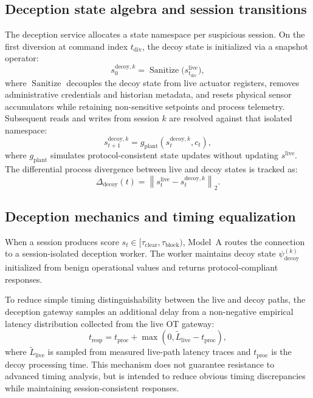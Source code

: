 \documentclass[journal]{IEEEtran}
\DeclareMathOperator{\Sanitize}{Sanitize}
\begin{document}
\subsection{Deception state algebra and session transitions}
The deception service allocates a state namespace per suspicious session. On the first diversion at command index $t_{\mathrm{div}}$, the decoy state is initialized via a snapshot operator:
\begin{equation}
s_0^{\mathrm{decoy}, k} = \Sanitize\bigl(s_{t_{\mathrm{div}}}^{\mathrm{live}}\bigr),
\end{equation}
where $\Sanitize$ decouples the decoy state from live actuator registers, removes administrative credentials and historian metadata, and resets physical sensor accumulators while retaining non-sensitive setpoints and process telemetry. Subsequent reads and writes from session $k$ are resolved against that isolated namespace:
\begin{equation}
s_{t+1}^{\mathrm{decoy}, k} = g_{\mathrm{plant}}(s_t^{\mathrm{decoy}, k}, c_t),
\end{equation}
where $g_{\mathrm{plant}}$ simulates protocol-consistent state updates without updating $s^{\mathrm{live}}$. The differential process divergence between live and decoy states is tracked as:
\begin{equation}
\Delta_{\mathrm{decoy}}(t) = \left\| s_t^{\mathrm{live}} - s_t^{\mathrm{decoy}, k} \right\|_2.
\end{equation}

\subsection{Deception mechanics and timing equalization}
When a session produces score $s_t \in [\tau_{\mathrm{clear}}, \tau_{\mathrm{block}})$, Model~A routes the connection to a session-isolated deception worker. The worker maintains decoy state $\psi_{\mathrm{decoy}}^{(k)}$ initialized from benign operational values and returns protocol-compliant responses.

To reduce simple timing distinguishability between the live and decoy paths, the deception gateway samples an additional delay from a non-negative empirical latency distribution collected from the live OT gateway:
\begin{equation}
t_{\mathrm{resp}} = t_{\mathrm{proc}} + \max\left(0, \widetilde{L}_{\mathrm{live}} - t_{\mathrm{proc}}\right),
\end{equation}
where $\widetilde{L}_{\mathrm{live}}$ is sampled from measured live-path latency traces and $t_{\mathrm{proc}}$ is the decoy processing time. This mechanism does not guarantee resistance to advanced timing analysis, but is intended to reduce obvious timing discrepancies while maintaining session-consistent responses.
\end{document}
